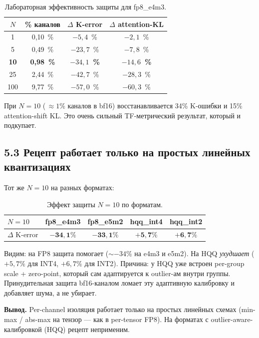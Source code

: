 \documentclass[a4paper,12pt]{article}
\begin{document}
\begin{table}[H]
\centering
\caption{Лабораторная эффективность защиты для fp8\_e4m3.}
\label{tab:defense}
\begin{tabular}{cccc}
\toprule
$N$ & \% каналов & $\Delta$ K-error & $\Delta$ attention-KL \\
\midrule
1   & 0,10~\% & $-5{,}4$~\% & $-2{,}1$~\% \\
5   & 0,49~\% & $-23{,}7$~\% & $-7{,}8$~\% \\
\textbf{10} & \textbf{0,98~\%} & \textbf{$-34{,}1$~\%} & \textbf{$-14{,}6$~\%} \\
25  & 2,44~\% & $-42{,}7$~\% & $-28{,}3$~\% \\
100 & 9,77~\% & $-57{,}0$~\% & $-60{,}3$~\% \\
\bottomrule
\end{tabular}
\end{table}

При $N = 10$ (\,$\approx 1\%$ каналов в bf16) восстанавливается 34\%
K-ошибки и 15\% attention-shift KL. Это очень сильный TF-метрический
результат, который и подкупает.

\subsection*{5.3 Рецепт работает только на простых линейных квантизациях}

Тот же $N = 10$ на разных форматах:

\begin{table}[H]
\centering
\caption{Эффект защиты $N=10$ по форматам.}
\label{tab:hqqdef}
\begin{tabular}{lcccc}
\toprule
$N=10$ & fp8\_e4m3 & fp8\_e5m2 & hqq\_int4 & hqq\_int2 \\
\midrule
$\Delta$ K-error & $\mathbf{-34{,}1\%}$ & $\mathbf{-33{,}1\%}$ & $\mathbf{+5{,}7\%}$ & $\mathbf{+6{,}7\%}$ \\
\bottomrule
\end{tabular}
\end{table}

Видим: на FP8 защита помогает ($\sim -34\%$ на e4m3 и e5m2). На HQQ
\textit{ухудшает} ($+5{,}7\%$ для INT4, $+6{,}7\%$ для INT2). Причина:
у HQQ уже встроен per-group scale + zero-point, который сам адаптируется
к outlier-ам внутри группы. Принудительная защита bf16-каналом ломает
эту адаптивную калибровку и добавляет шума, а не убирает.

\textbf{Вывод.} Per-channel изоляция работает только на простых линейных
схемах (min-max / abs-max на тензор --- как в per-tensor FP8). На
форматах с outlier-aware-калибровкой (HQQ) рецепт неприменим.
\end{document}
